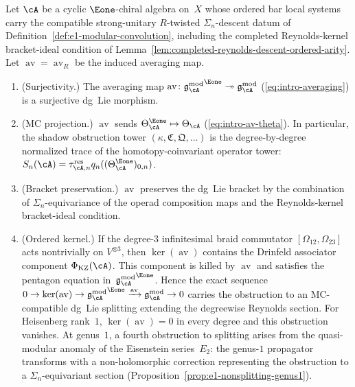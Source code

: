 \begin{theorem}
\label{thm:e1-primacy}
Let\/ $\cA$ be a cyclic $\Eone$-chiral algebra on\/~$X$ whose ordered
bar local systems carry the compatible strong-unitary
$R$-twisted $\Sigma_n$-descent datum of
Definition~\ref{def:e1-modular-convolution}, including the completed
Reynolds-kernel bracket-ideal condition of
Lemma~\ref{lem:completed-reynolds-descent-ordered-arity}. Let
$\operatorname{av}=\operatorname{av}_R$ be the induced averaging map.
\begin{enumerate}[label=\textup{(\roman*)}]
\item \textup{(Surjectivity.)}
 The averaging map
 $\operatorname{av}\colon {\gAmod}^{\Eone}
 \twoheadrightarrow \gAmod$
 \textup{(}\eqref{eq:intro-averaging}\textup{)}
 is a surjective dg~Lie morphism.
\item \textup{(MC projection.)}
 $\operatorname{av}$ sends
 $\Theta_\cA^{\Eone} \mapsto \Theta_\cA$
 \textup{(}\eqref{eq:intro-av-theta}\textup{)}.
 In particular, the shadow obstruction tower
 $(\kappa, \mathfrak{C}, \mathfrak{Q}, \ldots)$
 is the degree-by-degree normalized trace of the homotopy-coinvariant
 operator tower:
 $S_n(\cA)=\tau_{\cA,n}^{\mathrm{res}}
 q_n((\Theta_\cA^{\Eone})_{0,n})$.
\item \textup{(Bracket preservation.)}
 $\operatorname{av}$ preserves the dg~Lie bracket by the combination
 of $\Sigma_n$-equivariance of the operad composition maps and the
 Reynolds-kernel bracket-ideal condition.
\item \textup{(Ordered kernel.)}
 If the degree-$3$ infinitesimal braid commutator
 $[\Omega_{12},\Omega_{23}]$ acts nontrivially on
 $V^{\otimes 3}$, then $\ker(\operatorname{av})$ contains the
 Drinfeld associator component $\Phi_{\mathrm{KZ}}(\cA)$. This
 component is killed by\/ $\operatorname{av}$ and satisfies the
 pentagon equation in\/~${\gAmod}^{\Eone}$. Hence the exact sequence
 $0 \to \ker(\operatorname{av}) \to {\gAmod}^{\Eone}
 \xrightarrow{\operatorname{av}} \gAmod \to 0$
 carries the obstruction to an MC-compatible dg~Lie splitting
 extending the degreewise Reynolds section. For Heisenberg rank~$1$,
 $\ker(\operatorname{av})=0$ in every degree and this obstruction
 vanishes.
 At genus~$1$, a fourth obstruction to splitting arises from the
 quasi-modular anomaly of the Eisenstein series~$E_2$: the genus-$1$
 propagator transforms with a non-holomorphic correction representing
 the obstruction to a $\Sigma_n$-equivariant section
 (Proposition~\ref{prop:e1-nonsplitting-genus1}).
\end{enumerate}
\end{theorem}

